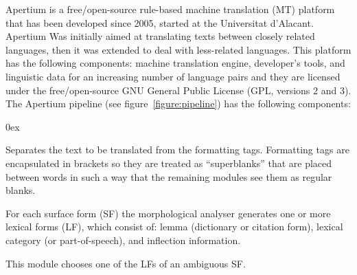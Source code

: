 \documentclass[11pt]{article}
\begin{document}
Apertium \citep{forcada11} is a free/open-source rule-based machine translation (MT) platform that 
has been developed since 2005, started at the Universitat d'Alacant. Apertium Was initially aimed at 
translating texts between closely related languages, then it was extended to deal with less-related 
languages. This platform has the following components: machine translation engine, developer's tools, and linguistic 
data for an increasing number of language pairs and they are licensed under the 
free/open-source GNU General Public License (GPL, versions 2 and 3). The Apertium pipeline (see figure~\ref{figure:pipeline}) has the following components:
\begin{description}\itemsep 0ex
\item[De-formatter:] Separates the text to be translated from the formatting tags.  Formatting tags are 
  encapsulated in brackets so they are treated as ``superblanks'' that are placed between words in 
  such a way that the remaining modules see them as regular blanks.  
\item[Morphological analyser:] For each surface form  (SF) the morphological analyser generates one or more 
  lexical forms (LF), which consist of: lemma (dictionary or citation form), lexical category (or part-of-speech), 
  and inflection information. 
\item[Part-of-speech (POS) tagger:] This module chooses one of the LFs of an ambiguous SF. 

\end{description}
\end{document}
